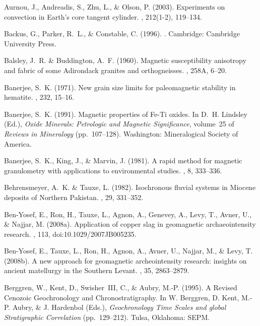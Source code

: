 \documentclass[11pt]{book}
\begin{document}
\begin{thebibliography}{}
Aurnou, J., Andreadis, S., Zhu, L., \& Olson, P. (2003).
\newblock Experiments on convection in Earth's core tangent cylinder.
, 212(1-2), 119--134.

Backus, G., Parker, R.~L., \& Constable, C. (1996).
.
\newblock Cambridge: Cambridge University Press.

Balsley, J.~R. \& Buddington, A.~F. (1960).
\newblock Magnetic susceptibility anisotropy and fabric of some Adirondack
  granites and orthogneisses.
, 258A, 6--20.

Banerjee, S.~K. (1971).
\newblock New grain size limits for paleomagnetic stability in hematite.
, 232, 15--16.

Banerjee, S.~K. (1991).
\newblock Magnetic properties of Fe-Ti oxides.
\newblock In D.~H. Lindsley (Ed.), {\em Oxide Minerals: Petrologic and Magnetic
  Significance}, volume~25 of {\em Reviews in Mineralogy}  (pp.\ 107–128).
  Washington: Mineralogical Society of America.

Banerjee, S.~K., King, J., \& Marvin, J. (1981).
\newblock A rapid method for magnetic granulometry with applications to
  environmental studies.
, 8, 333--336.

Behrensmeyer, A.~K. \& Tauxe, L. (1982).
\newblock Isochronous fluvial systems in Miocene deposits of Northern Pakistan.
, 29, 331--352.

Ben-Yosef, E., Ron, H., Tauxe, L., Agnon, A., Genevey, A., Levy, T., Avner, U.,
  \& Najjar, M. (2008a).
\newblock Application of copper slag in geomagnetic archaeointensity research.
, 113, doi:10.1029/2007JB005235.

Ben-Yosef, E., Tauxe, L., Ron, H., Agnon, A., Avner, U., Najjar, M., \& Levy,
  T. (2008b).
\newblock A new approach for geomagnetic archeointensity research: insights on
  ancient matellurgy in the Southern Levant.
, 35, 2863--2879.

Berggren, W., Kent, D., Swisher~III, C., \& Aubry, M.-P. (1995).
\newblock A Revised Cenozoic Geochronology and Chronostratigraphy.
\newblock In W. Berggren, D. Kent, M.-P. Aubry, \& J. Hardenbol (Eds.), {\em
  Geochronology Time Scales and global Stratigraphic Correlation}  (pp.\
  129--212). Tulsa, Oklahoma: SEPM.


\end{thebibliography}
\end{document}
